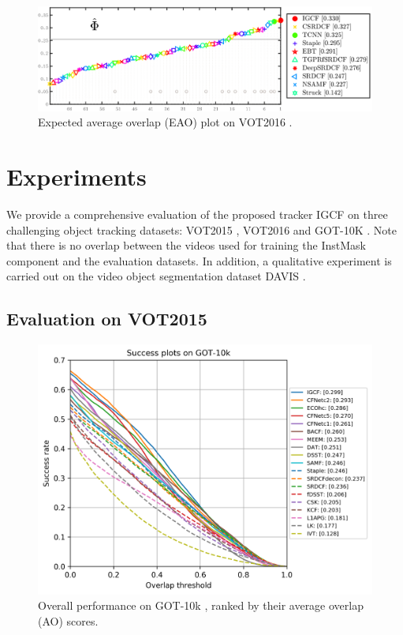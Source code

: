 \documentclass[review]{elsarticle}
\begin{document}
\begin{CJK*}{UTF8}{gbsn}
\begin{figure}
    \centering
    \includegraphics[width=12cm]{images/vot/eao_rank_vot2016.png}
    \caption{Expected average overlap (EAO) plot on VOT2016 \cite{Kristan2016TheVO}.}
    \label{fig:vot16}
\end{figure}

\section{Experiments}
We provide a comprehensive evaluation of the proposed tracker IGCF on three challenging object tracking datasets: VOT2015 \cite{Kristan2015TheVO}, VOT2016 \cite{Kristan2016TheVO} and GOT-10K \cite{Huang2018GOT10kAL}. Note that there is no overlap between the videos used for training the InstMask component and the evaluation datasets. In addition, a qualitative experiment is carried out on the video object segmentation dataset DAVIS \cite{Perazzi2016}.
\subsection{Evaluation on VOT2015}

\begin{figure}
    \centering
    \includegraphics[width=12cm]{images/got10k/success_plot.png}
    \caption{Overall performance on GOT-10k \cite{Huang2018GOT10kAL}, ranked by their average overlap (AO) scores.}
    \label{fig:got10k}
\end{figure}


\end{CJK*}
\end{document}
